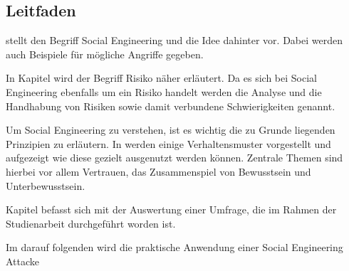 \subsection{Leitfaden}\label{sec:aufbau_der_arbeit}
 stellt den Begriff Social Engineering und die Idee dahinter vor.
Dabei werden auch Beispiele für mögliche Angriffe gegeben.

In Kapitel  wird der Begriff Risiko näher erläutert.
Da es sich bei Social Engineering ebenfalls um ein Risiko handelt werden die Analyse und die Handhabung
von Risiken sowie damit verbundene Schwierigkeiten genannt.

Um Social Engineering zu verstehen, ist es wichtig die zu Grunde liegenden Prinzipien zu erläutern.
In  werden einige Verhaltensmuster vorgestellt und aufgezeigt
wie diese gezielt ausgenutzt werden können.
Zentrale Themen sind hierbei vor allem Vertrauen, das Zusammenspiel von Bewusstsein und Unterbewusstsein.

Kapitel  befasst sich mit der Auswertung einer Umfrage, die im Rahmen der
Studienarbeit durchgeführt worden ist.

Im darauf folgenden  wird die praktische Anwendung einer Social Engineering Attacke 

